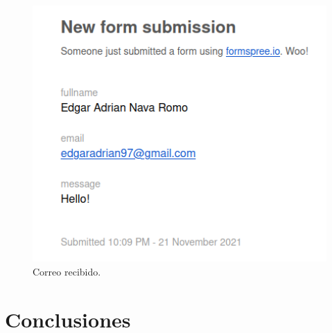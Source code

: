 \documentclass[12pt, a4paper, titlepage]{report}
\begin{document}
\begin{figure}[H] 
	\includegraphics[width=13.5cm]{./imagenes/Pruebas/Correo.png}
	\centering \caption{Correo recibido.}
\end{figure}


\newpage

\chapter{\textcolor{azulescom}{Conclusiones}}

\end{document}
